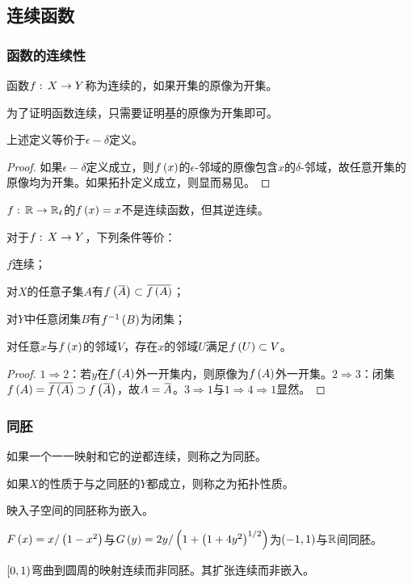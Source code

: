 \documentclass{ctexrep}
\begin{document}
  \subsection{连续函数}
  \subsubsection{函数的连续性}
  \begin{definition}
    函数$f:\, X \rightarrow Y$称为连续的，如果开集的原像为开集。
  \end{definition}
  为了证明函数连续，只需要证明基的原像为开集即可。
  \begin{ex}
  \label{ex:epsd}
    上述定义等价于$\epsilon-\delta$定义。
  \end{ex}
  \begin{proof}
    如果$\epsilon-\delta$定义成立，则$f\left(x\right)$的$\epsilon$-邻域的原像包含$x$的$\delta$-邻域，故任意开集的原像均为开集。如果拓扑定义成立，则显而易见。
  \end{proof}
  \begin{ex}
    $f:\, \mathbb{R} \rightarrow \mathbb{R}_\ell$的$f\left(x\right)=x$不是连续函数，但其逆连续。
  \end{ex}
  \begin{theorem}
  \label{thm:contineq}
    对于$f:\, X \rightarrow Y$，下列条件等价：
    \begin{cenum}
      \item $f$连续；
      \item 对$X$的任意子集$A$有$f\pare{\clo{A}}\subset\clo{f\pare{A}}$；
      \item 对$Y$中任意闭集$B$有$f^{-1}\left(B\right)$为闭集；
      \item 对任意$x$与$f\left(x\right)$的邻域$V$，存在$x$的邻域$U$满足$f\left(U\right)\subset{V}$。
    \end{cenum}
  \end{theorem}
  \begin{proof}
    $1\Rightarrow 2$：若$y$在$f\left(A\right)$外一开集内，则原像为$f\left(A\right)$外一开集。$2\Rightarrow 3$：闭集$f\pare{A} = \clo{f\pare{A}}\supset f\pare{\clo{A}}$，故$A=\clo{A}$。$3\Rightarrow 1$与$1\Rightarrow 4 \Rightarrow1$显然。
  \end{proof}
  \subsubsection{同胚}
  \begin{definition}
    如果一个一一映射和它的逆都连续，则称之为同胚。
  \end{definition}
  \begin{definition}
    如果$X$的性质于与之同胚的$Y$都成立，则称之为拓扑性质。
  \end{definition}
  \begin{definition}
    映入子空间的同胚称为嵌入。
  \end{definition}
  \begin{ex}
    $F\left(x\right)=x/\left(1-x^2\right)$与$G\left(y\right)=2y/\left(1+\left(1+4y^2\right)^{1/2}\right)$为$\left(-1,1\right)$与$\mathbb{R}$间同胚。
  \end{ex}
  \begin{ex}
    \label{ex:01tocircle}
    $\left[0,1\right)$弯曲到圆周的映射连续而非同胚。其扩张连续而非嵌入。
  \end{ex}
\end{document}
